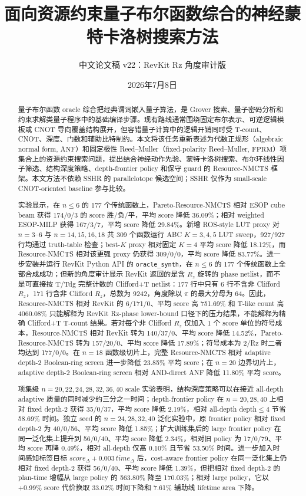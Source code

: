 \documentclass[UTF8,fontset=macnew,11pt]{ctexart}
\title{面向资源约束量子布尔函数综合的神经蒙特卡洛树搜索方法}
\author{中文论文稿 v22：RevKit Rz 角度审计版}
\date{2026年7月8日}
\newcommand{\method}{Resource-NMCTS}
\newcommand{\screen}{Boolean-ring screen}
\newcommand{\anf}{\ensuremath{\mathrm{ANF}}}
\newcommand{\fprm}{\ensuremath{\mathrm{FPRM}}}
\begin{document}
\pagestyle{plain}
\maketitle

\begin{abstract}
量子布尔函数 oracle 综合把经典谓词嵌入量子算法，是 Grover 搜索、量子密码分析和约束求解类量子程序中的基础编译步骤。现有路线通常围绕固定布尔表示、可逆逻辑模板或 CNOT 导向覆盖结构展开，但容错量子计算中的逻辑开销同时受 T-count、CNOT、深度、门数和辅助比特制约。本文将该任务重新表述为代数正规形（algebraic normal form, \anf{}）和固定极性 Reed--Muller（fixed-polarity Reed--Muller, \fprm{}）项集合上的资源约束搜索问题，提出结合神经动作先验、蒙特卡洛树搜索、布尔环线性因子筛选、结构深度策略、depth-frontier policy 和保守 guard 的 \method{} 框架。本文方法不依赖 SSHR 的 parallelotope 候选空间；SSHR 仅作为 small-scale CNOT-oriented baseline 参与比较。

实验显示，在 $n\leq6$ 的 177 个传统函数上，Pareto-\method{} 相对 ESOP cube beam 获得 174/0/3 的 score 胜/负/平，平均 score 降低 36.09\%；相对 weighted ESOP-MILP 获得 167/3/7，平均 score 降低 29.84\%。新增 ROS-style LUT proxy 对 $n=3$--$6$ 与 $n=14,15,16,18$ 共 309 个函数运行 ABC $K=3,4,5$ LUT sweep，927/927 行均通过 truth-table 检查；best-$K$ proxy 相对固定 $K=4$ 平均 score 降低 18.12\%，而 \method{} 相对该更强 proxy 仍获得 309/0/0，平均 score 降低 83.77\%。进一步安装并运行 RevKit Python API 的 \texttt{oracle\_synth}，在 $n\leq6$ 的 177 个传统函数上全部合成成功；但新的角度审计显示 RevKit 返回的是含 $R_z$ 旋转的 phase netlist，而不是可直接按 T/Tdg 完整计数的 Clifford+T netlist：177 行中只有 6 行不含非 Clifford $R_z$，171 行含非 Clifford $R_z$，总数为 9242，角度除以 $\pi$ 的最大分母为 64。因此，\method{} 相对 RevKit 的 6/171/0、平均 score 高 751.69\% 和 T-like count 高 4060.08\% 只能解释为 RevKit Rz-phase lower-bound 口径下的压力结果，不能解释为精确 Clifford+T T-count 结果。若对每个非 Clifford $R_z$ 仅加入 1 个 score 单位的符号成本，\method{} 相对 RevKit 转为 140/37/0、平均 score 降低 14.52\%，Pareto-\method{} 转为 157/20/0、平均 score 降低 17.89\%；符号成本为 2/Rz 时二者均达到 177/0/0。在 $n=18$ 函数级切片上，完整 \method{} 相对 adaptive depth-2 \screen{} 进一步降低 23.85\% 平均 score；在 $n=20$ 边界切片上，adaptive depth-2 \screen{} 相对 AND-direct ANF 降低 11.80\% 平均 score。

项集级 $n=20,22,24,28,32,36,40$ scale 实验表明，结构深度策略可以在接近 all-depth adaptive 质量的同时减少约三分之一时间；depth-frontier policy 在 $n=20,28,40$ 上相对 fixed depth-2 获得 35/0/37，平均 score 降低 2.19\%，相对 all-depth depth$\leq4$ 节省 58.69\% 时间。独立 seed 的 $n=24,28,32,40$ 泛化实验中，原 frontier policy 相对 fixed depth-2 为 40/0/56、平均 score 降低 1.85\%；扩大训练集后的 large frontier policy 在同一泛化集上提升到 56/0/40、平均 score 降低 2.34\%，相对旧 policy 为 17/0/79、平均 score 再降 0.49\%，相对 all-depth 仅高 0.10\% 且节省 53.50\% 时间。进一步加入时间感知标签目标 $score_{\Delta}+0.003\,time_{\Delta}$ 后，cost-aware frontier policy 在同一泛化集上仍相对 fixed depth-2 获得 56/0/40、平均 score 降低 1.39\%，但把相对 fixed depth-2 的 plan-time 增幅从 large policy 的 563.80\% 降至 170.03\%；相对 large policy，它以 +0.99\% score 代价换取 33.02\% 时间下降和 7.61\% 辅助线 lifetime area 下降。


\end{abstract}
\end{document}
